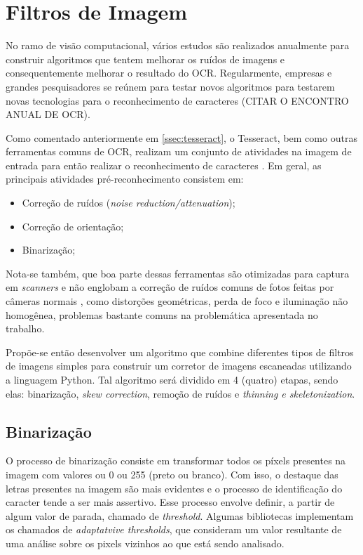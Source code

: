 \section{Filtros de Imagem}
No ramo de visão computacional, vários estudos são realizados anualmente para construir algoritmos que tentem melhorar os ruídos de imagens e consequentemente melhorar o resultado do OCR. Regularmente, empresas e grandes pesquisadores se reúnem para testar novos algoritmos para testarem novas tecnologias para o reconhecimento de caracteres (CITAR O ENCONTRO ANUAL DE OCR).

Como comentado anteriormente em \ref{ssec:tesseract}, o Tesseract, bem como outras ferramentas comuns de OCR, realizam um conjunto de atividades na imagem de entrada para então realizar o reconhecimento de caracteres \cite{image-preprocessing-for-improving-ocr}. Em geral, as principais atividades pré-reconhecimento consistem em:

\begin{itemize}
  \item Correção de ruídos (\textit{noise reduction/attenuation});
  \item Correção de orientação;
  \item Binarização;
\end{itemize}

Nota-se também, que boa parte dessas ferramentas são otimizadas para captura em \textit{scanners} e não englobam a correção de ruídos comuns de fotos feitas por câmeras normais \cite{image-preprocessing-for-improving-ocr}, como distorções geométricas, perda de foco e iluminação não homogênea, problemas bastante comuns na problemática apresentada no trabalho.

Propõe-se então desenvolver um algoritmo que combine diferentes tipos de filtros de imagens simples para construir um corretor de imagens escaneadas utilizando a linguagem Python. Tal algoritmo será dividido em 4 (quatro) etapas, sendo elas: binarização, \textit{skew correction}, remoção de ruídos e \textit{thinning e skeletonization}.

\subsection{Binarização}
O processo de binarização consiste em transformar todos os píxels presentes na imagem com valores ou 0 ou 255 (preto ou branco). Com isso, o destaque das letras presentes na imagem são mais evidentes e o processo de identificação do caracter tende a ser mais assertivo. Esse processo envolve definir, a partir de algum valor de parada, chamado de \textit{threshold}. Algumas bibliotecas implementam os chamados de \textit{adaptatvive thresholds}, que consideram um valor resultante de uma análise sobre os pixels vizinhos ao que está sendo analisado.

